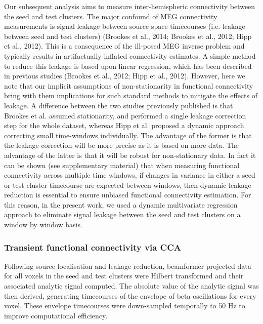 Our subsequent analysis aims to measure inter-hemispheric connectivity between the seed and test clusters. The major confound of MEG connectivity measurements is signal leakage between source space timecourses (i.e. leakage between seed and test clusters) (Brookes et al., 2014; Brookes et al., 2012; Hipp et al., 2012). This is a consequence of the ill-posed MEG inverse problem and typically results in artifactually inflated connectivity estimates. A simple method to reduce this leakage is based upon linear regression, which has been described in previous studies (Brookes et al., 2012; Hipp et al., 2012). However, here we note that our implicit assumptions of non-stationarity in functional connectivity bring with them implications for such standard methods to mitigate the effects of leakage. A difference between the two studies previously published is that Brookes et al. assumed stationarity, and performed a single leakage correction step for the whole dataset, whereas Hipp et al. proposed a dynamic approach correcting small time-windows individually. The advantage of the former is that the leakage correction will be more precise as it is based on more data. The advantage of the latter is that it will be robust for non-stationary data. In fact it can be shown (see supplementary material) that when measuring functional connectivity across multiple time windows, if changes in variance in either a seed or test cluster timecourse are expected between windows, then dynamic leakage reduction is essential to ensure unbiased functional connectivity estimation. For this reason, in the present work, we used a dynamic multivariate regression approach to eliminate signal leakage between the seed and test clusters on a window by window basis.

\subsubsection{Transient functional connectivity via CCA}
Following source localisation and leakage reduction, beamformer projected data for all voxels in the seed and test clusters were Hilbert transformed and their associated analytic signal computed. The absolute value of the analytic signal was then derived, generating timecourses of the envelope of beta oscillations for every voxel. These envelope timecourses were down-sampled temporally to 50 Hz to improve computational efficiency. 

